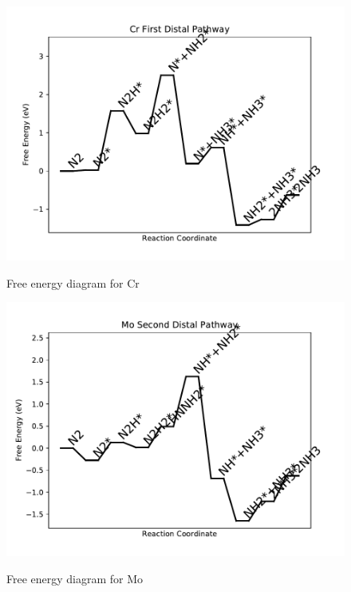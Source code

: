 \documentclass{article}
\begin{document}
\newpage
\begin{figure}
\includegraphics[width=1\linewidth]{data/plots/Cr_distal_1.pdf}
\label{fig:Cr_distal_1}
\caption{Free energy diagram for Cr}
\end{figure}

\begin{figure}
\includegraphics[width=1\linewidth]{data/plots/Mo_distal_2.pdf}
\label{fig:Mo_distal_2}
\caption{Free energy diagram for Mo}
\end{figure}
\end{document}
